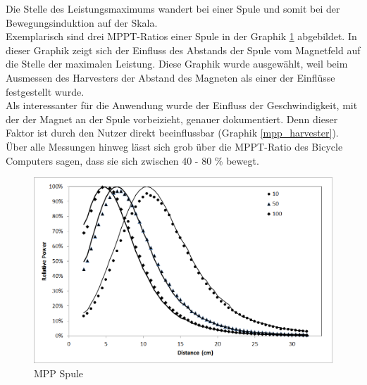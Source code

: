 
Die Stelle des Leistungsmaximums wandert bei einer Spule und somit bei der Bewegungsinduktion auf der Skala. \\
Exemplarisch sind drei MPPT-Ratios einer Spule in der Graphik \ref{mpp_spule} abgebildet. In dieser Graphik zeigt sich der Einfluss des Abstands der Spule vom Magnetfeld auf die Stelle der maximalen Leistung. Diese Graphik wurde ausgewählt, weil beim Ausmessen des Harvesters der Abstand des Magneten als einer der Einflüsse festgestellt wurde.\\

Als interessanter für die Anwendung wurde der Einfluss der Geschwindigkeit, mit der der Magnet an der Spule vorbeizieht, genauer dokumentiert. Denn dieser Faktor ist durch den Nutzer direkt beeinflussbar (Graphik \ref{mpp_harvester}). \\


Über alle Messungen hinweg lässt sich grob über die MPPT-Ratio des Bicycle Computers sagen, dass sie sich zwischen 40 - 80 \% bewegt.

\begin{figure}
   \includegraphics{2TheoretischeGrundlagen/imag/MPPSpule.png}
   \caption{MPP Spule}\label{mpp_spule} 
\end{figure}


